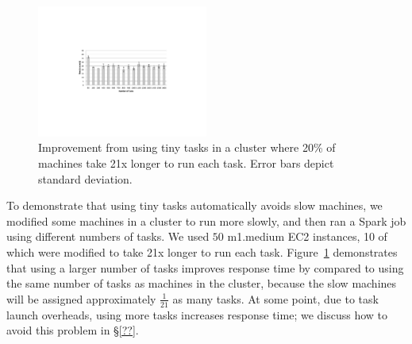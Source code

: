 \begin{figure}[!t]
\centering
\hspace{2ex}
\includegraphics[width=0.5\textwidth]{figures/spark-skew-results}
\vspace{-4ex}
\caption{Improvement from using tiny tasks in a cluster where 20\% of machines
take 21x longer to run each task. Error bars depict standard deviation.}
\vspace{-2ex}
\label{fig:sparkskew}
\end{figure}



To demonstrate that using tiny tasks automatically avoids slow machines,
we modified some machines in a cluster to run more slowly, and then
ran a Spark job using different numbers of tasks. We used $50$ m1.medium EC2
instances, 10 of which were modified to take 21x longer to run each task.
Figure~\ref{fig:sparkskew} demonstrates that using a larger number of tasks
improves response time by  compared to using the same number
of tasks as machines in the cluster, because the slow machines will be
assigned approximately $\frac{1}{21}$ as many tasks. At some point, due to
task launch overheads, using more tasks increases response time; we discuss
how to avoid this problem in \S\ref{??}.

